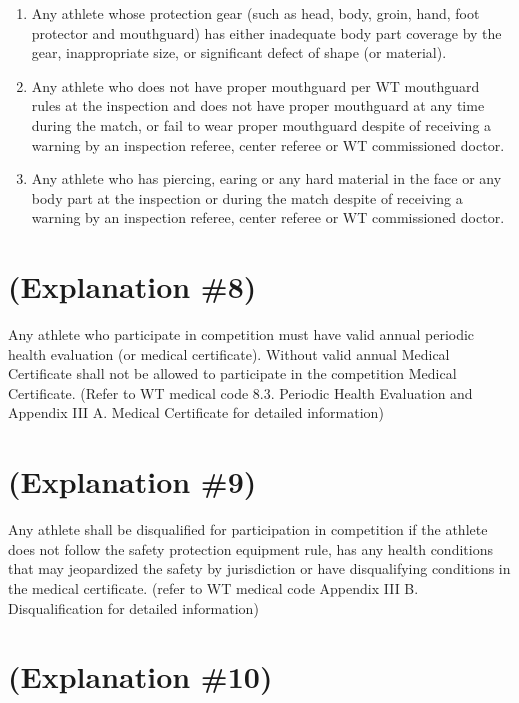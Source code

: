 \documentclass[
]{report}
\providecommand{\tightlist}{%
  \setlength{\itemsep}{0pt}\setlength{\parskip}{0pt}}
\renewcommand{\labelenumi}{\arabic{enumi}}
\begin{document}
\begin{enumerate}
\def\labelenumi{(\arabic{enumi})}
\tightlist
\item
  Any athlete whose protection gear (such as head, body, groin, hand,
  foot protector and mouthguard) has either inadequate body part
  coverage by the gear, inappropriate size, or significant defect of
  shape (or material).
\item
  Any athlete who does not have proper mouthguard per WT mouthguard
  rules at the inspection and does not have proper mouthguard at any
  time during the match, or fail to wear proper mouthguard despite of
  receiving a warning by an inspection referee, center referee or WT
  commissioned doctor.
\item
  Any athlete who has piercing, earing or any hard material in the face
  or any body part at the inspection or during the match despite of
  receiving a warning by an inspection referee, center referee or WT
  commissioned doctor.
\end{enumerate}

\section{(Explanation \#8)}\label{explanation-8}

Any athlete who participate in competition must have valid annual
periodic health evaluation (or medical certificate). Without valid
annual Medical Certificate shall not be allowed to participate in the
competition Medical Certificate. (Refer to WT medical code 8.3. Periodic
Health Evaluation and Appendix III A. Medical Certificate for detailed
information)

\section{(Explanation \#9)}\label{explanation-9}

Any athlete shall be disqualified for participation in competition if
the athlete does not follow the safety protection equipment rule, has
any health conditions that may jeopardized the safety by jurisdiction or
have disqualifying conditions in the medical certificate. (refer to WT
medical code Appendix III B. Disqualification for detailed information)

\section{(Explanation \#10)}\label{explanation-10}
\end{document}
